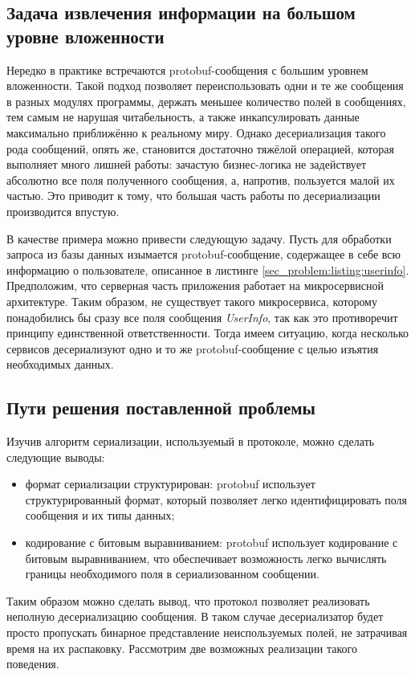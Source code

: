 \subsection{Задача извлечения информации на большом уровне вложенности}

Нередко в практике встречаются protobuf-сообщения с большим уровнем вложенности. Такой подход позволяет переиспользовать одни и те же сообщения в разных модулях
программы, держать меньшее количество полей в сообщениях, тем самым не нарушая читабельность, а также инкапсулировать данные максимально приближённо к реальному миру.
Однако десериализация такого рода сообщений, опять же, становится достаточно тяжёлой операцией, которая выполняет много лишней работы: зачастую бизнес-логика не задействует
абсолютно все поля полученного сообщения, а, напротив, пользуется малой их частью. Это приводит к тому, что большая часть работы по десериализации производится впустую.

В качестве примера можно привести следующую задачу. Пусть для обработки запроса из базы данных
изымается protobuf-сообщение, содержащее в себе всю информацию о пользователе, описанное в листинге \ref{sec_problem:listing:userinfo}.
Предположим, что серверная часть приложения работает на микросервисной архитектуре. Таким образом, не существует такого микросервиса,
которому понадобились бы сразу все поля сообщения \textit{UserInfo}, так как это противоречит принципу единственной ответственности.
Тогда имеем ситуацию, когда несколько сервисов десериализуют одно и то же protobuf-сообщение с целью изъятия необходимых данных.

\subsection{Пути решения поставленной проблемы}

Изучив алгоритм сериализации, используемый в протоколе, можно сделать следующие выводы:
\begin{itemize}
    \item формат сериализации структурирован: protobuf использует структурированный формат, который позволяет легко идентифицировать поля сообщения и их типы данных;
    \item кодирование с битовым выравниванием: protobuf использует кодирование с битовым выравниванием, что обеспечивает возможность легко вычислять границы необходимого поля в сериализованном сообщении.
\end{itemize}

Таким образом можно сделать вывод, что протокол позволяет реализовать неполную десериализацию сообщения.
В таком случае десериализатор будет просто пропускать бинарное представление неиспользуемых полей, не затрачивая время на их распаковку.
Рассмотрим две возможных реализации такого поведения.

